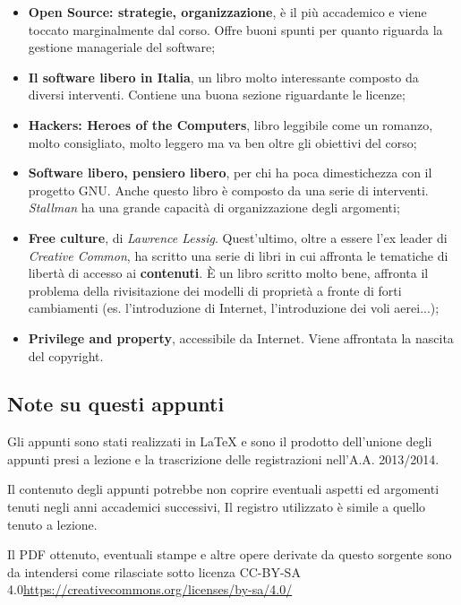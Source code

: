 \begin{itemize}

\item \textbf{Open Source: strategie, organizzazione}, è il più accademico e viene toccato marginalmente dal corso. Offre buoni spunti per quanto riguarda la gestione manageriale del software;
\item \textbf{Il software libero in Italia}, un libro molto interessante composto da diversi interventi. Contiene una buona sezione riguardante le licenze;
\item \textbf{Hackers: Heroes of the Computers}, libro leggibile come un romanzo, molto consigliato, molto leggero ma va ben oltre gli obiettivi del corso;
\item \textbf{Software libero, pensiero libero}, per chi ha poca dimestichezza con il progetto GNU. Anche questo libro è composto da una serie di interventi. \textit{Stallman} ha una grande capacità di organizzazione degli argomenti;
\item \textbf{Free culture}, di \textit{Lawrence Lessig}. Quest'ultimo, oltre a essere l'ex leader di \textit{Creative Common}, ha scritto una serie di libri in cui affronta le tematiche di libertà di accesso ai \textbf{contenuti}. È un libro scritto molto bene, affronta il problema della rivisitazione dei modelli di proprietà a fronte di forti cambiamenti (es. l'introduzione di Internet, l'introduzione dei voli aerei...);
\item \textbf{Privilege and property}, accessibile da Internet. Viene affrontata la nascita del copyright.

\end{itemize}

\subsection{Note su questi appunti}
Gli appunti sono stati realizzati in LaTeX e sono il prodotto dell'unione degli appunti presi a lezione e la trascrizione delle registrazioni nell'A.A. 2013/2014. 

Il contenuto degli appunti potrebbe non coprire eventuali aspetti ed argomenti tenuti negli anni accademici successivi, Il registro utilizzato è simile a quello tenuto a lezione.

Il PDF ottenuto, eventuali stampe e altre opere derivate da questo sorgente sono da intendersi come rilasciate sotto licenza CC-BY-SA 4.0\url{https://creativecommons.org/licenses/by-sa/4.0/}


